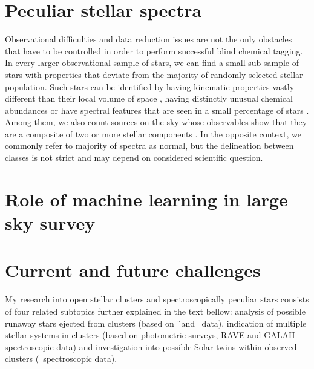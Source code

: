 \section{Peculiar stellar spectra}
Observational difficulties and data reduction issues are not the only obstacles that have to be controlled in order to perform successful blind chemical tagging. In every larger observational sample of stars, we can find a small sub-sample of stars with properties that deviate from the majority of randomly selected stellar population. Such stars can be identified by having kinematic properties vastly different than their local volume of space \cite{2010MNRAS.407.2241K, 2011ApJ...728..102W, 2017arXiv171003763C}, having distinctly unusual chemical abundances \cite{1974ARA&A..12..257P} or have spectral features that are seen in a small percentage of stars \cite{2010AJ....140.1758T, 2017ApJS..228...24T}. Among them, we also count sources on the sky whose observables show that they are a composite of two or more stellar components \citep{2010AJ....140..184M, 2018MNRAS.473.5043E, 2018MNRAS.476..528E}. In the opposite context, we commonly refer to majority of spectra as normal, but the delineation between classes is not strict and may depend on considered scientific question.

\section{Role of machine learning in large sky survey}



\section{Current and future challenges}
My research into open stellar clusters and spectroscopically peculiar stars consists of four related subtopics further explained in the text bellow: analysis of possible runaway stars ejected from clusters (based on \G\ and \Gh\ data), indication of multiple stellar systems in clusters (based on photometric surveys, RAVE and GALAH spectroscopic data) and investigation into possible Solar twins within observed clusters (\Gh\ spectroscopic data).

